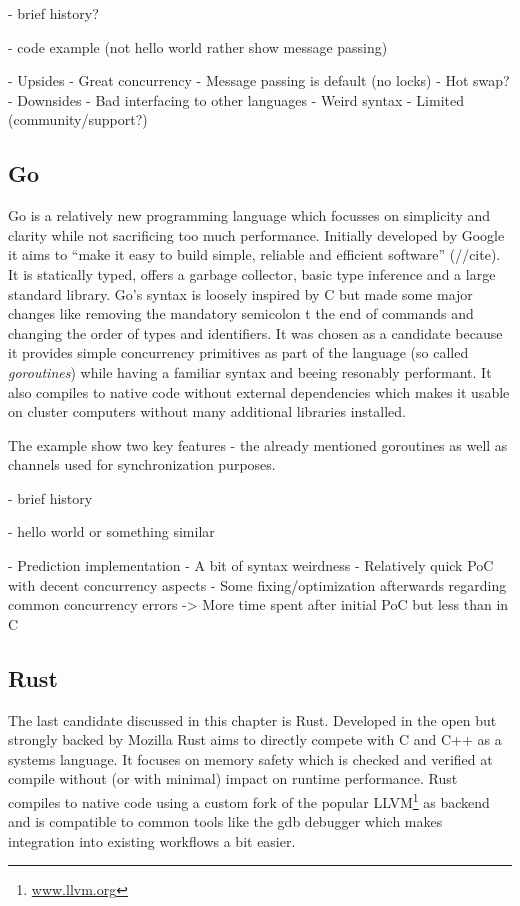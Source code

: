- brief history?

- code example (not hello world rather show message passing)

- Upsides
    - Great concurrency
    - Message passing is default (no locks)
    - Hot swap?
- Downsides
    - Bad interfacing to other languages
    - Weird syntax
    - Limited (community/support?)


\subsection*{Go}
\label{subsec:State_of_the_art::Candidates::Go}
Go is a relatively new programming language which focusses on simplicity and clarity while not sacrificing too much performance. Initially developed by Google it aims to ``make it easy to build simple, reliable and efficient software'' (//cite). It is statically typed, offers a garbage collector, basic type inference and a large standard library. Go's syntax is loosely inspired by C but made some major changes like removing the mandatory semicolon t the end of commands and changing the order of types and identifiers. It was chosen as a candidate because it provides simple concurrency primitives as part of the language (so called \textit{goroutines}) while having a familiar syntax and beeing resonably performant. It also compiles to native code without external dependencies which makes it usable on cluster computers without many additional libraries installed.

The example show two key features - the already mentioned goroutines as well as channels used for synchronization purposes.



- brief history

- hello world or something similar


- Prediction implementation
    - A bit of syntax weirdness
    - Relatively quick PoC with decent concurrency aspects
    - Some fixing/optimization afterwards regarding common concurrency errors
    -> More time spent after initial PoC but less than in C


\subsection*{Rust}
\label{subsec:State_of_the_artState_of_the_art::Candidates::Rust}
The last candidate discussed in this chapter is Rust. Developed in the open but strongly backed by Mozilla Rust aims to directly compete with C and C++ as a systems language. It focuses on memory safety which is checked and verified at compile without (or with minimal) impact on runtime performance. Rust compiles to native code using a custom fork of the popular LLVM\footnote{\url{www.llvm.org}} as backend and is compatible to common tools like the gdb debugger which makes integration into existing workflows a bit easier.

